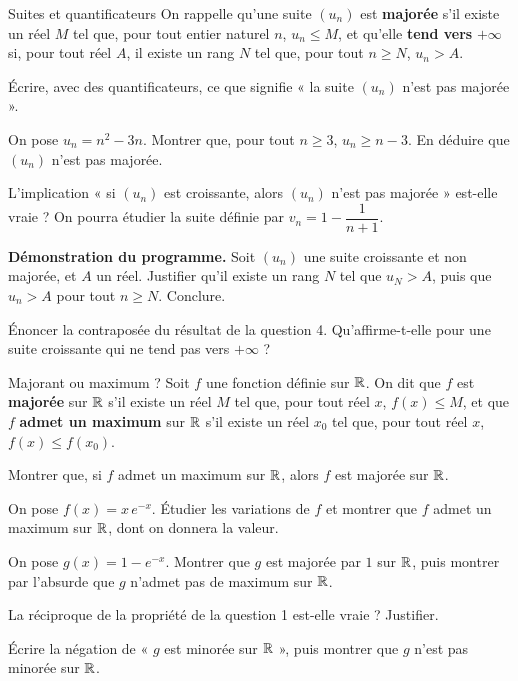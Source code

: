 
\begin{exercice}[3]{Suites et quantificateurs}
On rappelle qu'une suite $(u_n)$ est \textbf{majorée} s'il existe un réel $M$ tel que, pour tout entier naturel $n$, $u_n\leq M$,
et qu'elle \textbf{tend vers} $+\infty$ si, pour tout réel $A$, il existe un rang $N$ tel que, pour tout $n\geq N$, $u_n>A$.
\begin{questions}
  \item Écrire, avec des quantificateurs, ce que signifie « la suite $(u_n)$ n'est pas majorée ».
  \item On pose $u_n=n^{2}-3n$. Montrer que, pour tout $n\geq3$, $u_n\geq n-3$. En déduire que $(u_n)$ n'est pas majorée.
  \item L'implication « si $(u_n)$ est croissante, alors $(u_n)$ n'est pas majorée » est-elle vraie ? On pourra étudier la suite
    définie par $v_n=1-\dfrac{1}{n+1}$.
  \item \textbf{Démonstration du programme.} Soit $(u_n)$ une suite croissante et non majorée, et $A$ un réel. Justifier qu'il
    existe un rang $N$ tel que $u_N>A$, puis que $u_n>A$ pour tout $n\geq N$. Conclure.
  \item Énoncer la contraposée du résultat de la question 4. Qu'affirme-t-elle pour une suite croissante qui ne tend pas vers
    $+\infty$ ?
\end{questions}
\end{exercice}

\begin{exercice}[3]{Majorant ou maximum ?}
Soit $f$ une fonction définie sur $\mathbb{R}$. On dit que $f$ est \textbf{majorée} sur $\mathbb{R}$ s'il existe un réel $M$ tel que, pour tout
réel $x$, $f(x)\leq M$, et que $f$ \textbf{admet un maximum} sur $\mathbb{R}$ s'il existe un réel $x_0$ tel que, pour tout réel $x$,
$f(x)\leq f(x_0)$.
\begin{questions}
  \item Montrer que, si $f$ admet un maximum sur $\mathbb{R}$, alors $f$ est majorée sur $\mathbb{R}$.
  \item On pose $f(x)=x\,e^{-x}$. Étudier les variations de $f$ et montrer que $f$ admet un maximum sur $\mathbb{R}$, dont on donnera la
    valeur.
  \item On pose $g(x)=1-e^{-x}$. Montrer que $g$ est majorée par $1$ sur $\mathbb{R}$, puis montrer par l'absurde que $g$ n'admet pas de
    maximum sur $\mathbb{R}$.
  \item La réciproque de la propriété de la question 1 est-elle vraie ? Justifier.
  \item Écrire la négation de « $g$ est minorée sur $\mathbb{R}$ », puis montrer que $g$ n'est pas minorée sur $\mathbb{R}$.
\end{questions}
\end{exercice}

